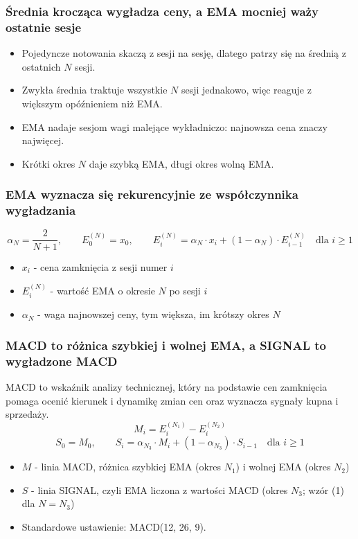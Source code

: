 
\begin{frame}
  \frametitle{Średnia krocząca wygładza ceny, a EMA mocniej waży ostatnie sesje}
  \begin{itemize}
    \item Pojedyncze notowania skaczą z sesji na sesję, dlatego patrzy się
      na średnią z ostatnich $N$ sesji.
    \item Zwykła średnia traktuje wszystkie $N$ sesji jednakowo, więc
      reaguje z większym opóźnieniem niż EMA.
    \item EMA nadaje sesjom wagi malejące wykładniczo: najnowsza cena
      znaczy najwięcej.
    \item Krótki okres $N$ daje szybką EMA, długi okres wolną EMA.
  \end{itemize}
\end{frame}

\begin{frame}
  \frametitle{EMA wyznacza się rekurencyjnie ze współczynnika wygładzania}
  \begin{equation*}
    \alpha_N = \frac{2}{N+1},\qquad
    E_0^{(N)} = x_0,\qquad
    E_i^{(N)} = \alpha_N \cdot x_i + (1 - \alpha_N) \cdot E_{i-1}^{(N)}
    \quad\text{dla } i \ge 1
    \tag{1}
  \end{equation*}
  \vskip2mm
  \begin{itemize}
    \item $x_i$ - cena zamknięcia z sesji numer $i$
    \item $E_i^{(N)}$ - wartość EMA o okresie $N$ po sesji $i$
    \item $\alpha_N$ - waga najnowszej ceny, tym większa, im krótszy
      okres $N$
  \end{itemize}
\end{frame}

\begin{frame}
  \frametitle{MACD to różnica szybkiej i wolnej EMA, a SIGNAL to wygładzone
    MACD}
  MACD to wskaźnik analizy technicznej, który na podstawie cen zamknięcia
  pomaga ocenić kierunek i dynamikę zmian cen oraz wyznacza sygnały kupna
  i sprzedaży.
  \begin{equation*}
    M_i = E_i^{(N_1)} - E_i^{(N_2)}
    \tag{2}
  \end{equation*}
  \begin{equation*}
    S_0 = M_0,\qquad
    S_i = \alpha_{N_3} \cdot M_i + (1 - \alpha_{N_3}) \cdot S_{i-1}
    \quad\text{dla } i \ge 1
    \tag{3}
  \end{equation*}
  \vskip2mm
  \begin{itemize}
    \item $M$ - linia MACD, różnica szybkiej EMA (okres $N_1$) i wolnej
      EMA (okres $N_2$)
    \item $S$ - linia SIGNAL, czyli EMA liczona z wartości MACD
      (okres $N_3$; wzór (1) dla $N = N_3$)
    \item Standardowe ustawienie: MACD(12, 26, 9).
  \end{itemize}
\end{frame}

